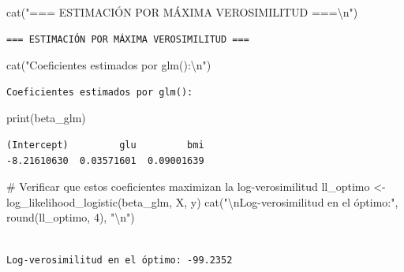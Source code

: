 \documentclass[
  letterpaper,
  DIV=11,
  numbers=noendperiod]{scrreprt}
\newenvironment{Shaded}{\begin{snugshade}}{\end{snugshade}}
\newcommand{\CommentTok}[1]{\textcolor[rgb]{0.37,0.37,0.37}{#1}}
\newcommand{\DecValTok}[1]{\textcolor[rgb]{0.68,0.00,0.00}{#1}}
\newcommand{\FunctionTok}[1]{\textcolor[rgb]{0.28,0.35,0.67}{#1}}
\newcommand{\NormalTok}[1]{\textcolor[rgb]{0.00,0.23,0.31}{#1}}
\newcommand{\OtherTok}[1]{\textcolor[rgb]{0.00,0.23,0.31}{#1}}
\newcommand{\SpecialCharTok}[1]{\textcolor[rgb]{0.37,0.37,0.37}{#1}}
\newcommand{\StringTok}[1]{\textcolor[rgb]{0.13,0.47,0.30}{#1}}
\begin{document}
\begin{tcolorbox}
\begin{Shaded}
\begin{Highlighting}[]
\FunctionTok{cat}\NormalTok{(}\StringTok{"=== ESTIMACIÓN POR MÁXIMA VEROSIMILITUD ===}\SpecialCharTok{\textbackslash{}n}\StringTok{"}\NormalTok{)}
\end{Highlighting}
\end{Shaded}

\begin{verbatim}
=== ESTIMACIÓN POR MÁXIMA VEROSIMILITUD ===
\end{verbatim}

\begin{Shaded}
\begin{Highlighting}[]
\FunctionTok{cat}\NormalTok{(}\StringTok{"Coeficientes estimados por glm():}\SpecialCharTok{\textbackslash{}n}\StringTok{"}\NormalTok{)}
\end{Highlighting}
\end{Shaded}

\begin{verbatim}
Coeficientes estimados por glm():
\end{verbatim}

\begin{Shaded}
\begin{Highlighting}[]
\FunctionTok{print}\NormalTok{(beta\_glm)}
\end{Highlighting}
\end{Shaded}

\begin{verbatim}
(Intercept)         glu         bmi 
-8.21610630  0.03571601  0.09001639 
\end{verbatim}

\begin{Shaded}
\begin{Highlighting}[]
\CommentTok{\# Verificar que estos coeficientes maximizan la log{-}verosimilitud}
\NormalTok{ll\_optimo }\OtherTok{\textless{}{-}} \FunctionTok{log\_likelihood\_logistic}\NormalTok{(beta\_glm, X, y)}
\FunctionTok{cat}\NormalTok{(}\StringTok{"}\SpecialCharTok{\textbackslash{}n}\StringTok{Log{-}verosimilitud en el óptimo:"}\NormalTok{, }\FunctionTok{round}\NormalTok{(ll\_optimo, }\DecValTok{4}\NormalTok{), }\StringTok{"}\SpecialCharTok{\textbackslash{}n}\StringTok{"}\NormalTok{)}
\end{Highlighting}
\end{Shaded}

\begin{verbatim}

Log-verosimilitud en el óptimo: -99.2352 
\end{verbatim}


\end{tcolorbox}
\end{document}
